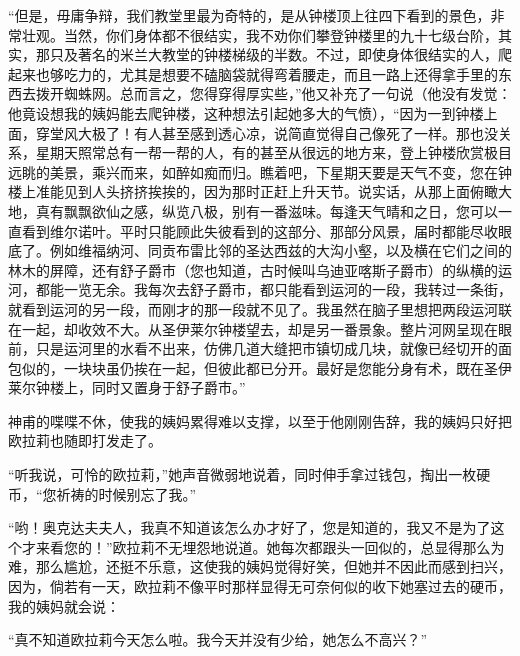 \par “但是，毋庸争辩，我们教堂里最为奇特的，是从钟楼顶上往四下看到的景色，非常壮观。当然，你们身体都不很结实，我不劝你们攀登钟楼里的九十七级台阶，其实，那只及著名的米兰大教堂的钟楼梯级的半数。不过，即使身体很结实的人，爬起来也够吃力的，尤其是想要不磕脑袋就得弯着腰走，而且一路上还得拿手里的东西去拨开蜘蛛网。总而言之，您得穿得厚实些，”他又补充了一句说（他没有发觉：他竟设想我的姨妈能去爬钟楼，这种想法引起她多大的气愤），“因为一到钟楼上面，穿堂风大极了！有人甚至感到透心凉，说简直觉得自己像死了一样。那也没关系，星期天照常总有一帮一帮的人，有的甚至从很远的地方来，登上钟楼欣赏极目远眺的美景，乘兴而来，如醉如痴而归。瞧着吧，下星期天要是天气不变，您在钟楼上准能见到人头挤挤挨挨的，因为那时正赶上升天节。说实话，从那上面俯瞰大地，真有飘飘欲仙之感，纵览八极，别有一番滋味。每逢天气晴和之日，您可以一直看到维尔诺叶。平时只能顾此失彼看到的这部分、那部分风景，届时都能尽收眼底了。例如维福纳河、同贡布雷比邻的圣达西兹的大沟小壑，以及横在它们之间的林木的屏障，还有舒子爵市（您也知道，古时候叫乌迪亚喀斯子爵市）的纵横的运河，都能一览无余。我每次去舒子爵市，都只能看到运河的一段，我转过一条街，就看到运河的另一段，而刚才的那一段就不见了。我虽然在脑子里想把两段运河联在一起，却收效不大。从圣伊莱尔钟楼望去，却是另一番景象。整片河网呈现在眼前，只是运河里的水看不出来，仿佛几道大缝把市镇切成几块，就像已经切开的面包似的，一块块虽仍挨在一起，但彼此都已分开。最好是您能分身有术，既在圣伊莱尔钟楼上，同时又置身于舒子爵市。”
\par 神甫的喋喋不休，使我的姨妈累得难以支撑，以至于他刚刚告辞，我的姨妈只好把欧拉莉也随即打发走了。
\par “听我说，可怜的欧拉莉，”她声音微弱地说着，同时伸手拿过钱包，掏出一枚硬币，“您祈祷的时候别忘了我。”
\par “哟！奥克达夫夫人，我真不知道该怎么办才好了，您是知道的，我又不是为了这个才来看您的！”欧拉莉不无埋怨地说道。她每次都跟头一回似的，总显得那么为难，那么尴尬，还挺不乐意，这使我的姨妈觉得好笑，但她并不因此而感到扫兴，因为，倘若有一天，欧拉莉不像平时那样显得无可奈何似的收下她塞过去的硬币，我的姨妈就会说：
\par “真不知道欧拉莉今天怎么啦。我今天并没有少给，她怎么不高兴？”
